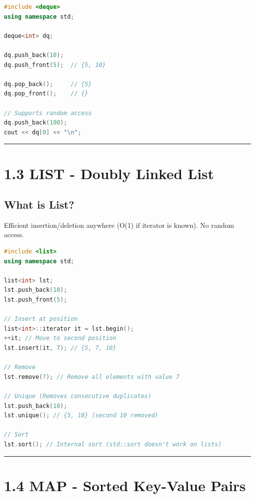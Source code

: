\begin{lstlisting}[language={C++}]
#include <deque>
using namespace std;

deque<int> dq;

dq.push_back(10);
dq.push_front(5);  // {5, 10}

dq.pop_back();     // {5}
dq.pop_front();    // {}

// Supports random access
dq.push_back(100);
cout << dq[0] << "\n";
\end{lstlisting}

\begin{center}\rule{0.5\linewidth}{0.5pt}\end{center}

\hypertarget{list---doubly-linked-list}{%
\section{1.3 LIST - Doubly Linked
List}\label{list---doubly-linked-list}}

\hypertarget{what-is-list}{%
\subsection{What is List?}\label{what-is-list}}

Efficient insertion/deletion anywhere (O(1) if iterator is known). No
random access.

\begin{lstlisting}[language={C++}]
#include <list>
using namespace std;

list<int> lst;
lst.push_back(10);
lst.push_front(5);

// Insert at position
list<int>::iterator it = lst.begin();
++it; // Move to second position
lst.insert(it, 7); // {5, 7, 10}

// Remove
lst.remove(7); // Remove all elements with value 7

// Unique (Removes consecutive duplicates)
lst.push_back(10);
lst.unique(); // {5, 10} (second 10 removed)

// Sort
lst.sort(); // Internal sort (std::sort doesn't work on lists)
\end{lstlisting}

\begin{center}\rule{0.5\linewidth}{0.5pt}\end{center}

\hypertarget{map---sorted-key-value-pairs}{%
\section{1.4 MAP - Sorted Key-Value
Pairs}\label{map---sorted-key-value-pairs}}

